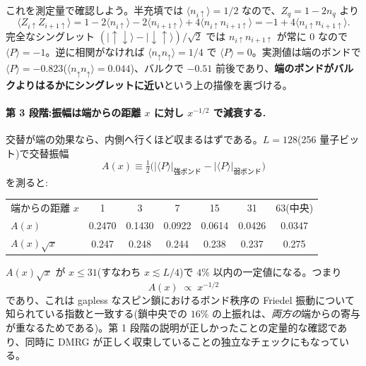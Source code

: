 \documentclass[11pt,a4paper]{ltjsarticle}
\newcommand{\ket}[1]{|#1\rangle}
\newcommand{\ev}[1]{\langle #1\rangle}
\begin{document}
これを測定量で確認しよう。半充填では $\ev{n_{i\uparrow}}=1/2$ なので、$Z_q=1-2n_q$ より
\begin{equation}
  \ev{Z_{i\uparrow}Z_{i+1\uparrow}}
  = 1 - 2\ev{n_{i\uparrow}} - 2\ev{n_{i+1\uparrow}} + 4\ev{n_{i\uparrow}n_{i+1\uparrow}}
  = -1 + 4\ev{n_{i\uparrow}n_{i+1\uparrow}}.
\end{equation}
完全なシングレット $(\ket{\uparrow\downarrow}-\ket{\downarrow\uparrow})/\sqrt2$ では $n_{i\uparrow}n_{i+1\uparrow}$ が常に $0$ なので $\ev{P}=-1$。逆に相関がなければ $\ev{n_\uparrow n_\uparrow}=1/4$ で $\ev{P}=0$。実測値は端のボンドで $\ev{P}=-0.823$($\ev{n_\uparrow n_\uparrow}=0.044$)、バルクで $-0.51$ 前後であり、\textbf{端のボンドがバルクよりはるかにシングレットに近い}という上の描像を裏づける。

\paragraph{第 3 段階:振幅は端からの距離 $x$ に対し $x^{-1/2}$ で減衰する.}
交替が端の効果なら、内側へ行くほど収まるはずである。$L=128$(256 量子ビット)で交替振幅
\[
  A(x)\equiv\tfrac12\bigl(|\ev{P}|_{\text{強ボンド}}-|\ev{P}|_{\text{弱ボンド}}\bigr)
\]
を測ると:

\begin{center}\small
\begin{tabular}{lcccccc}
\hline
端からの距離 $x$ & 1 & 3 & 7 & 15 & 31 & 63(中央)\\
$A(x)$ & 0.2470 & 0.1430 & 0.0922 & 0.0614 & 0.0426 & 0.0347\\
$A(x)\sqrt{x}$ & 0.247 & 0.248 & 0.244 & 0.238 & 0.237 & 0.275\\
\hline
\end{tabular}
\end{center}

$A(x)\sqrt x$ が $x\le31$(すなわち $x\lesssim L/4$)で $4\%$ 以内の一定値になる。つまり
\begin{equation}
  A(x)\;\propto\;x^{-1/2}
\end{equation}
であり、これは gapless なスピン鎖におけるボンド秩序の Friedel 振動について知られている指数と一致する(鎖中央での $16\%$ の上振れは、\emph{両方の}端からの寄与が重なるためである)。第 1 段階の説明が正しかったことの定量的な確認であり、同時に DMRG が正しく収束していることの独立なチェックにもなっている。
\end{document}
